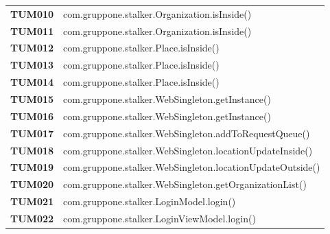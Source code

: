 \documentclass[../../piano-di-qualifica.tex]{subfiles}
\begin{document}
\begin{longtable}[H]{>{\centering\bfseries}m{3cm} >{}m{13cm}}
  TUM010             & com.gruppone.stalker.Organization.isInside\@()                                                          \\

  TUM011             & com.gruppone.stalker.Organization.isInside\@()                                                          \\

  TUM012             & com.gruppone.stalker.Place.isInside\@()                                                                 \\

  TUM013             & com.gruppone.stalker.Place.isInside\@()                                                                 \\

  TUM014             & com.gruppone.stalker.Place.isInside\@()                                                                 \\

  TUM015             & com.gruppone.stalker.WebSingleton.getInstance\@()                                                       \\

  TUM016             & com.gruppone.stalker.WebSingleton.getInstance\@()                                                       \\

  TUM017             & com.gruppone.stalker.WebSingleton.addToRequestQueue\@()                                                 \\

  TUM018             & com.gruppone.stalker.WebSingleton.locationUpdateInside\@()                                              \\

  TUM019             & com.gruppone.stalker.WebSingleton.locationUpdateOutside\@()                                             \\

  TUM020             & com.gruppone.stalker.WebSingleton.getOrganizationList\@()                                               \\


  TUM021             & com.gruppone.stalker.LoginModel.login\@()                                                               \\

  TUM022             & com.gruppone.stalker.LoginViewModel.login\@()                                                           \\


\end{longtable}
\end{document}
